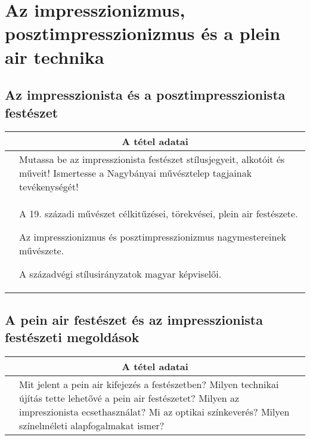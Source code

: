 \chapter{Az impresszionizmus, posztimpresszionizmus és a plein air technika} %
\label{ch:14_impresszionizmus_posztimpresszionizmus}

\section{Az impresszionista és a posztimpresszionista festészet}

\begin{center}
	\begin{longtable}{ | p{} | p{} | }
		
		\hline
		\multicolumn{2}{|c|}{\textbf{A tétel adatai}}
		\\ \hline
		\hline
		
		\centering{Tétel teljes címe}
		&
		Mutassa be az impresszionista festészet stílusjegyeit, alkotóit és műveit! Ismertesse a Nagybányai művésztelep tagjainak tevékenységét!
		\\ \hline
		
		\centering{Jegyzetek}
		&
		\begin{compactitem}
			\item A 19. századi művészet célkitűzései, törekvései, plein air festészete.
			\item Az impresszionizmus és posztimpresszionizmus nagymestereinek művészete.
			\item A századvégi stílusirányzatok magyar képviselői.
		\end{compactitem}
		\\\hline
		
	\end{longtable}
\end{center}

\cleardoublepage


\section{A pein air festészet és az impresszionista festészeti megoldások}

\begin{center}
	\begin{longtable}{ | p{} | p{} | }
		
		\hline
		\multicolumn{2}{|c|}{\textbf{A tétel adatai}}
		\\ \hline
		\hline
		
		\centering{Tétel teljes címe}
		&
		Mit jelent a pein air kifejezés a festészetben? Milyen technikai újítás tette lehetővé a pein air festészetet? Milyen az impreszionista ecsethasználat? Mi az optikai színkeverés? Milyen színelméleti alapfogalmakat ismer?
		\\ \hline
		
	\end{longtable}
\end{center}
